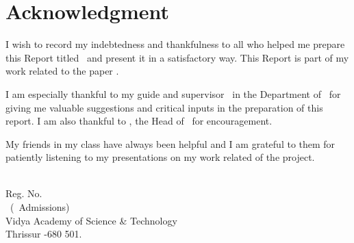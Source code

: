 %
\chapter*{Acknowledgment}
%
I wish to record my indebtedness and thankfulness 
to all who helped me prepare this Report titled 
\vtitle\  and present it in a satisfactory way. This Report is part of my work related to the paper \vpaper.

I am especially thankful to my 
guide and supervisor \vguide\  in the Department of \vdept\  
for giving me valuable suggestions and 
critical inputs in the preparation of this report. 
I am also thankful to \vhod, 
the Head of \vdept\  
for encouragement. 

My friends in my class have always been 
helpful and I am grateful to them for 
patiently listening to  my presentations on my work related  of the project. 

\begin{flushright}
\vauthor\\
Reg. No. \vregisternumber\\
\vclass\  (\vadmissionyear\  Admissions)\\
Vidya Academy of Science \& Technology\\
Thrissur -680 501.
\end{flushright}